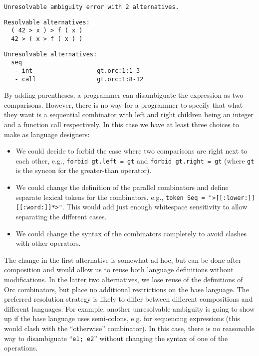\documentclass[acmsmall,review,anonymous]{acmart}\settopmatter{printfolios=true,printccs=false,printacmref=false}
\newcommand{\ocaml}{\lstinline[language={[objective]caml}]}
\newcommand{\syncon}{\lstinline[language=syncon]}
\begin{document}
\begin{lstlisting}[language={[objective]caml}]
Unresolvable ambiguity error with 2 alternatives.
\end{lstlisting}

\begin{minipage}{.3\textwidth}
\begin{lstlisting}[language={[objective]caml}]
Resolvable alternatives:
  ( 42 > x ) > f ( x )
  42 > ( x > f ( x ) )
\end{lstlisting}
\end{minipage}
\hfill
\begin{minipage}{.5\textwidth}
\begin{lstlisting}[language={[objective]caml}]
Unresolvable alternatives:
  seq
   - int                  gt.orc:1:1-3
   - call                 gt.orc:1:8-12
\end{lstlisting}
\end{minipage}

\noindent
By adding parentheses, a programmer can disambiguate the
expression as two comparisons. However, there is no way for a
programmer to specify that what they want is a sequential
combinator with left and right children being an integer and a
function call respectively. In this case we have at least three
choices to make as language designers:

\begin{itemize}
\item We could decide to forbid the case where two comparisons are
  right next to each other, e.g., \syncon{forbid gt.left = gt} and
  \syncon{forbid gt.right = gt} (where \syncon{gt} is the syncon
  for the greater-than operator).
\item We could change the definition of the parallel combinators
  and define separate lexical tokens for the combinators, e.g.,
  \syncon{token Seq = ">[[:lower:]][[:word:]]*>"}. This would add
  just enough whitespace sensitivity to allow separating the
  different cases.
\item We could change the syntax of the combinators completely to
  avoid clashes with other operators.
\end{itemize}

\noindent
The change in the first alternative is somewhat ad-hoc, but can be done after composition
and would allow us to reuse both language definitions without
modifications. In the latter two alternatives, we lose reuse of
the definitions of Orc combinators, but place no additional
restrictions on the base language. The preferred resolution
strategy is likely to differ between different compositions and
different languages.
%
For example, another unresolvable ambiguity is going to show up if
the base language uses semi-colons, e.g. for sequencing
expressions (this would clash with the ``otherwise'' combinator).
In this case, there is no reasonable way to disambiguate
``\ocaml{e1; e2}'' without changing the syntax of one of the
operations.
\end{document}
